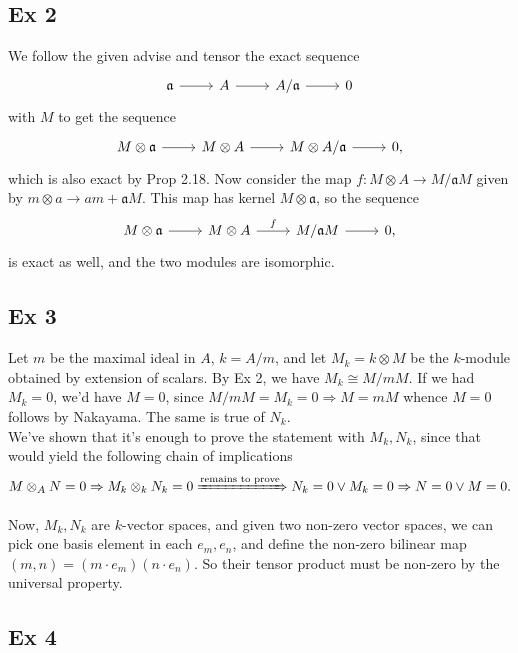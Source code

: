\documentclass{article}
\theoremstyle{definition}
\begin{document}
\subsection*{Ex 2}
We follow the given advise and tensor the exact sequence
\[
	\begin{tikzcd}
		\mathfrak{a} \arrow[r] & 
		A \arrow[r] & 
		A / \mathfrak{a} \arrow[r] & 
		0
	\end{tikzcd}
\] 
with $M$ to get the sequence
\[
	\begin{tikzcd}
		M \otimes \mathfrak{a} \arrow[r] & 
		M \otimes A \arrow[r] & 
		M \otimes A / \mathfrak{a} \arrow[r] & 
		0,
	\end{tikzcd}
\]
which is also exact by Prop 2.18. Now consider the map $f: M \otimes A \to M/\mathfrak{a}M$ given by
$m \otimes a \to am + \mathfrak{a}M$. This map has kernel $M \otimes \mathfrak{a}$, so the sequence
\[
	\begin{tikzcd}
		M \otimes \mathfrak{a} \arrow[r] & 
		M \otimes A \arrow{r}{f} & 
		M / \mathfrak{a}M \arrow[r] & 
		0,
	\end{tikzcd}
\]
is exact as well, and the two modules are isomorphic.

\subsection*{Ex 3}
Let $m$ be the maximal ideal in $A$, $k = A/m$, and  let $M_k = k \otimes M$ be
the $k$-module obtained by extension of scalars. By Ex 2, we have $M_k \cong
M/mM$. If we had $M_k = 0$, we'd have $M = 0$, since $M / mM = M_k = 0
\Rightarrow M = mM$ whence $M = 0$ follows by Nakayama. The same is true of
$N_k$. \\

We've shown that it's enough to prove the statement with $M_k, N_k$, since
that would yield the following chain of implications
\[
	M \otimes_{A} N = 0 
	\Rightarrow
	M_k \otimes_{k} N_k = 0 
	\xRightarrow{\text{remains to prove}}
	N_k = 0 \lor M_k = 0 
	\Rightarrow
	N = 0 \lor M = 0.
\]

Now, $M_k, N_k$ are $k$-vector spaces, and given two non-zero vector spaces, we
can pick one basis element in each $e_m, e_n$, and define the non-zero bilinear
map $(m, n) = (m \cdot e_m)(n \cdot e_n)$. So their tensor product must be
non-zero by the universal property.


\subsection*{Ex 4}
\end{document}
